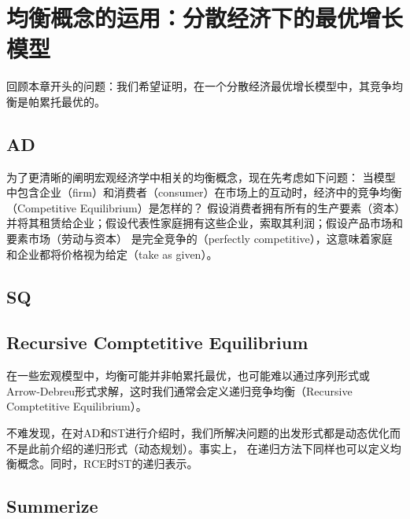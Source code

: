 
\section{均衡概念的运用：分散经济下的最优增长模型}  \label{sec-decentralized-equilibrium}

回顾本章开头的问题：我们希望证明，在一个分散经济最优增长模型中，其竞争均衡是帕累托最优的。



\subsection{AD}

为了更清晰的阐明宏观经济学中相关的均衡概念，现在先考虑如下问题：
当模型中包含企业（firm）和消费者（consumer）在市场上的互动时，经济中的竞争均衡（Competitive Equilibrium）是怎样的？
假设消费者拥有所有的生产要素（资本）并将其租赁给企业；假设代表性家庭拥有这些企业，索取其利润；假设产品市场和要素市场（劳动与资本）
是完全竞争的（perfectly competitive），这意味着家庭和企业都将价格视为给定（take as given）。


\subsection{SQ}


\subsection{Recursive Comptetitive Equilibrium}

在一些宏观模型中，均衡可能并非帕累托最优，也可能难以通过序列形式或Arrow-Debreu形式求解，这时我们通常会定义递归竞争均衡（Recursive Comptetitive Equilibrium）。

不难发现，在对AD和ST进行介绍时，我们所解决问题的出发形式都是动态优化而不是此前介绍的递归形式（动态规划）。事实上，
在递归方法下同样也可以定义均衡概念。同时，RCE时ST的递归表示。


\subsection{Summerize}